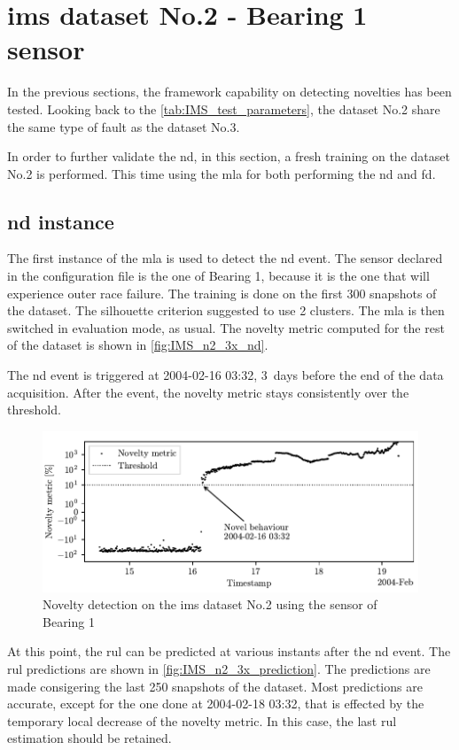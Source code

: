 \section{\gls{ims} dataset No.2 - Bearing 1 sensor}
\label{sec:IMS_n2_3x}

In the previous sections, the framework capability on detecting novelties has been tested. Looking back to the \autoref{tab:IMS_test_parameters}, the dataset No.2 share the same type of fault as the dataset No.3.

In order to further validate the \gls{nd}, in this section, a fresh training on the dataset No.2 is performed. This time using the \gls{mla} for both performing the \gls{nd} and \gls{fd}.

\subsection{\gls{nd} instance}
The first instance of the \gls{mla} is used to detect the \gls{nd} event. The sensor declared in the configuration file is the one of Bearing 1, because it is the one that will experience outer race failure. The training is done on the first 300 snapshots of the dataset. The silhouette criterion suggested to use 2 clusters. The \gls{mla} is then switched in evaluation mode, as usual. The novelty metric computed for the rest of the dataset is shown in \autoref{fig:IMS_n2_3x_nd}. 

The \gls{nd} event is triggered at 2004-02-16 03:32, 3~days before the end of the data acquisition. After the event, the novelty metric stays consistently over the threshold. 

\begin{figure}
    \centering
    \includegraphics{images/IMS/Test02/ND.pdf}
    \caption{Novelty detection on the \gls{ims} dataset No.2 using the sensor of Bearing 1}
    \label{fig:IMS_n2_3x_nd}
\end{figure}

At this point, the \gls{rul} can be predicted at various instants after the \gls{nd} event. The \gls{rul} predictions are shown in \autoref{fig:IMS_n2_3x_prediction}. The predictions are made consigering the last 250 snapshots of the dataset. Most predictions are accurate, except for the one done at 2004-02-18 03:32, that is effected by the temporary local decrease of the novelty metric. In this case, the last \gls{rul} estimation should be retained.

